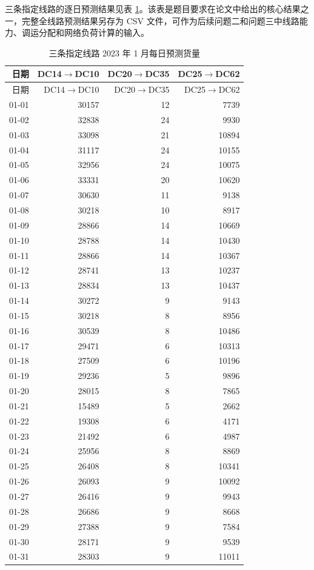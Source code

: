 \documentclass[UTF8,zihao=-4,a4paper,fontset=fandol]{ctexart}
\begin{document}
三条指定线路的逐日预测结果见表 \ref{tab:target-daily}。该表是题目要求在论文中给出的核心结果之一，完整全线路预测结果另存为 CSV 文件，可作为后续问题二和问题三中线路能力、调运分配和网络负荷计算的输入。

\begin{longtable}{rrrr}
  \caption{三条指定线路 2023 年 1 月每日预测货量}
  \label{tab:target-daily}\\
  \toprule
  日期 & DC14$\rightarrow$DC10 & DC20$\rightarrow$DC35 & DC25$\rightarrow$DC62 \\
  \midrule
  \endfirsthead
  \toprule
  日期 & DC14$\rightarrow$DC10 & DC20$\rightarrow$DC35 & DC25$\rightarrow$DC62 \\
  \midrule
  \endhead
  01-01 & 30157 & 12 & 7739 \\
  01-02 & 32838 & 24 & 9930 \\
  01-03 & 33098 & 21 & 10894 \\
  01-04 & 31117 & 24 & 10155 \\
  01-05 & 32956 & 24 & 10075 \\
  01-06 & 33331 & 20 & 10620 \\
  01-07 & 30630 & 11 & 9138 \\
  01-08 & 30218 & 10 & 8917 \\
  01-09 & 28866 & 14 & 10669 \\
  01-10 & 28788 & 14 & 10430 \\
  01-11 & 28866 & 14 & 10367 \\
  01-12 & 28741 & 13 & 10237 \\
  01-13 & 28834 & 13 & 10437 \\
  01-14 & 30272 & 9 & 9143 \\
  01-15 & 30218 & 8 & 8956 \\
  01-16 & 30539 & 8 & 10486 \\
  01-17 & 29471 & 6 & 10313 \\
  01-18 & 27509 & 6 & 10196 \\
  01-19 & 29236 & 5 & 9896 \\
  01-20 & 28015 & 8 & 7865 \\
  01-21 & 15489 & 5 & 2662 \\
  01-22 & 19308 & 6 & 4171 \\
  01-23 & 21492 & 6 & 4987 \\
  01-24 & 25956 & 8 & 8869 \\
  01-25 & 26408 & 8 & 10341 \\
  01-26 & 26093 & 9 & 10092 \\
  01-27 & 26416 & 9 & 9943 \\
  01-28 & 26686 & 9 & 8668 \\
  01-29 & 27388 & 9 & 7584 \\
  01-30 & 28171 & 9 & 9539 \\
  01-31 & 28303 & 9 & 11011 \\
  \bottomrule
\end{longtable}
\end{document}
